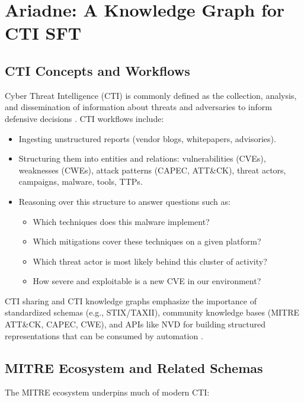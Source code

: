 \documentclass[unnumsec,webpdf,contemporary,large]{oup-authoring-template}
\theoremstyle{thmstyleone}
\theoremstyle{thmstyletwo}
\theoremstyle{thmstylethree}
\begin{document}
\section{Ariadne: A Knowledge Graph for CTI SFT}
\label{sec:cti-kg}

\subsection{CTI Concepts and Workflows}

Cyber Threat Intelligence (CTI) is commonly defined as the collection, analysis, and dissemination of information about threats and adversaries to inform defensive decisions \cite{mcmillan2013gartner}. CTI workflows include:

\begin{itemize}
  \item Ingesting unstructured reports (vendor blogs, whitepapers, advisories).
  \item Structuring them into entities and relations: vulnerabilities (CVEs), weaknesses (CWEs), attack patterns (CAPEC, ATT\&CK), threat actors, campaigns, malware, tools, TTPs.
  \item Reasoning over this structure to answer questions such as:
    \begin{itemize}
      \item Which techniques does this malware implement?
      \item Which mitigations cover these techniques on a given platform?
      \item Which threat actor is most likely behind this cluster of activity?
      \item How severe and exploitable is a new CVE in our environment?
    \end{itemize}
\end{itemize}

CTI sharing and CTI knowledge graphs emphasize the importance of standardized schemas (e.g., STIX/TAXII), community knowledge bases (MITRE ATT\&CK, CAPEC, CWE), and APIs like NVD for building structured representations that can be consumed by automation \cite{strom2018mitreattck,mitreCVE,mitreCWE,mitreCAPEC}.

\subsection{MITRE Ecosystem and Related Schemas}

The MITRE ecosystem underpins much of modern CTI:
\end{document}
